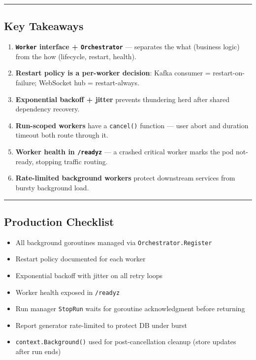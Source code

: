 \documentclass[
]{article}
\providecommand{\tightlist}{%
  \setlength{\itemsep}{0pt}\setlength{\parskip}{0pt}}
\begin{document}
\begin{center}\rule{0.5\linewidth}{0.5pt}\end{center}

\hypertarget{key-takeaways}{%
\subsection{Key Takeaways}\label{key-takeaways}}

\begin{enumerate}
\def\labelenumi{\arabic{enumi}.}
\tightlist
\item
  \textbf{\texttt{Worker} interface + \texttt{Orchestrator}} ---
  separates the what (business logic) from the how (lifecycle, restart,
  health).
\item
  \textbf{Restart policy is a per-worker decision}: Kafka consumer =
  restart-on-failure; WebSocket hub = restart-always.
\item
  \textbf{Exponential backoff + jitter} prevents thundering herd after
  shared dependency recovery.
\item
  \textbf{Run-scoped workers} have a \texttt{cancel()} function --- user
  abort and duration timeout both route through it.
\item
  \textbf{Worker health in \texttt{/readyz}} --- a crashed critical
  worker marks the pod not-ready, stopping traffic routing.
\item
  \textbf{Rate-limited background workers} protect downstream services
  from bursty background load.
\end{enumerate}

\begin{center}\rule{0.5\linewidth}{0.5pt}\end{center}

\hypertarget{production-checklist}{%
\subsection{Production Checklist}\label{production-checklist}}

\begin{itemize}
\tightlist
\item[$\square$]
  All background goroutines managed via \texttt{Orchestrator.Register}
\item[$\square$]
  Restart policy documented for each worker
\item[$\square$]
  Exponential backoff with jitter on all retry loops
\item[$\square$]
  Worker health exposed in \texttt{/readyz}
\item[$\square$]
  Run manager \texttt{StopRun} waits for goroutine acknowledgment before
  returning
\item[$\square$]
  Report generator rate-limited to protect DB under burst
\item[$\square$]
  \texttt{context.Background()} used for post-cancellation cleanup
  (store updates after run ends)
\end{itemize}
\end{document}
